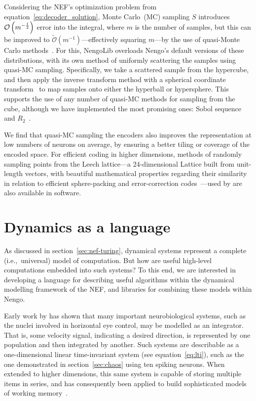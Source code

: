 Considering the NEF's optimization problem from equation~\ref{eq:decoder_solution},
Monte Carlo~(MC) sampling $S$ introduces $\mathcal{O}\left({ m^{-\frac{1}{2}} }\right)$ error into the integral, where $m$ is the number of samples, but this can be improved to $\widetilde{\mathcal{O}} \left( m^{-1} \right)$---effectively squaring $m$---by the use of quasi-Monte Carlo methods~\citep{fang1994, knight2016}.
For this, NengoLib overloads Nengo's default versions of these distributions, with its own method of uniformly scattering the samples using quasi-MC sampling.
Specifically, we take a scattered sample from the hypercube, and then apply the inverse transform method with a spherical coordinate transform~\citep{fang1994} to map samples onto either the hyperball or hypersphere.
This supports the use of any number of quasi-MC methods for sampling from the cube, although we have implemented the most promising ones: Sobol sequence and $R_2$~\citep{Sobol1967, quasimc}.

We find that quasi-MC sampling the encoders also improves the representation at low numbers of neurons on average, by ensuring a better tiling or coverage of the encoded space.
For efficient coding in higher dimensions, methods of randomly sampling points from the Leech lattice---a 24-dimensional Lattice built from  unit-length vectors, with beautiful mathematical properties regarding their similarity in relation to efficient sphere-packing and error-correction codes~\citep{Conway1999}---used by \citet{knight2016} are also available in software.


\section{Dynamics as a language}
\label{sec:dynamics-language}

As discussed in section~\ref{sec:nef-turing}, dynamical systems represent a complete (i.e.,~universal) model of computation.
But how are useful high-level computations embedded into such systems?
To this end, we are interested in developing a language for describing useful algorithms within the dynamical modelling framework of the NEF, and libraries for combining these models within Nengo.

Early work by \citet{eliasmith2003a} has shown that many important neurobiological systems, such as the nuclei involved in horizontal eye control, may be modelled as an integrator.
That is, some velocity signal, indicating a desired direction, is represented by one population and then integrated by another.
Such systems are describable as a one-dimensional linear time-invariant system (see equation~\ref{eq:lti}), such as the one demonstrated in section~\ref{sec:chaos} using ten spiking neurons. 
When extended to higher dimensions, this same system is capable of storing multiple items in series, and has consequently been applied to build sophisticated models of working memory~\citep{singh2004, choo2010}.

